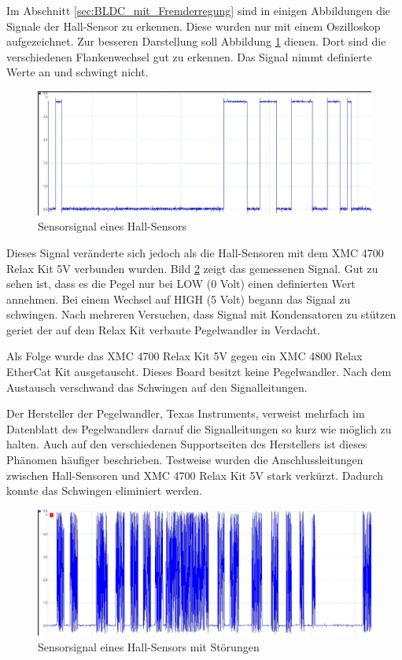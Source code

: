 Im Abschnitt \ref{sec:BLDC_mit_Fremderregung} sind in einigen Abbildungen die Signale der Hall-Sensor zu erkennen.
Diese wurden nur mit einem Oszilloskop aufgezeichnet.
Zur besseren Darstellung soll Abbildung \ref{fig:Hall_Sensor_OK} dienen.
Dort sind die verschiedenen Flankenwechsel gut zu erkennen.
Das Signal nimmt definierte Werte an und schwingt nicht.


\begin{figure}[htbp]
	\centering
	\includegraphics[width=\textwidth-4cm]{tests/graphics/hall_ok}
	\caption[Sensorsignal Hall-Sensor]{Sensorsignal eines Hall-Sensors}
	\label{fig:Hall_Sensor_OK}
\end{figure}

Dieses Signal veränderte sich jedoch als die Hall-Sensoren mit dem XMC 4700 Relax Kit 5V verbunden wurden.
Bild \ref{fig:Hall_Sensor_Fehlerhaft} zeigt das gemessenen Signal.
Gut zu sehen ist, dass es die Pegel nur bei LOW (0 Volt) einen definierten Wert annehmen.
Bei einem Wechsel auf HIGH (5 Volt) begann das Signal zu schwingen.
Nach mehreren Versuchen, dass Signal mit Kondensatoren zu stützen geriet der auf dem Relax Kit verbaute Pegelwandler in Verdacht.

Als Folge wurde das XMC 4700 Relax Kit 5V gegen ein XMC 4800 Relax EtherCat Kit ausgetauscht.
Dieses Board besitzt keine Pegelwandler.
Nach dem Austausch verschwand das Schwingen auf den Signalleitungen.

Der Hersteller der Pegelwandler, Texas Instruments, verweist mehrfach im Datenblatt des Pegelwandlers darauf die Signalleitungen so kurz wie möglich zu halten.
Auch auf den verschiedenen Supportseiten des Herstellers ist dieses Phänomen häufiger beschrieben.
Testweise wurden die Anschlussleitungen zwischen Hall-Sensoren und XMC 4700 Relax Kit 5V stark verkürzt.
Dadurch konnte das Schwingen eliminiert werden.

\begin{figure}[htbp]
	\centering
	\includegraphics[width=\textwidth-4cm]{tests/graphics/hall_jitter_4700}
	\caption[Fehlerhaftes Sensorsignal eines Hall-Sensors]{Sensorsignal eines Hall-Sensors mit Störungen}
	\label{fig:Hall_Sensor_Fehlerhaft}
\end{figure}


